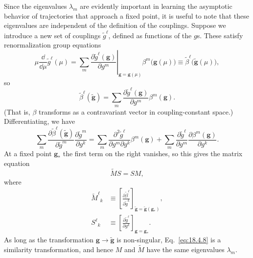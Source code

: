 Since the eigenvalues $\lambda_m$ are evidently important in learning the asymptotic behavior of trajectories that approach a fixed point, it is useful to note that these eigenvalues are independent of the definition of the couplings. Suppose we introduce a new set of couplings $\widetilde g^\ell$, defined as functions of the $g$s. These satisfy renormalization group equations
\[
\mu\frac{\dd}{\dd\mu}\widetilde g^\ell(\mu)
=\left.\sum_m\frac{\partial\widetilde g^\ell(\mathbf{g})}{\partial g^m}\right|_{\mathbf{g}=\mathbf{g}(\mu)}
\beta^m\bigl(\mathbf{g}(\mu)\bigr)
\equiv\widetilde\beta^\ell\bigl(\widetilde{\mathbf{g}}(\mu)\bigr),
\]
so
\begin{equation}
\widetilde\beta^\ell(\widetilde{\mathbf{g}})
=\sum_m\frac{\partial\widetilde g^\ell(\mathbf{g})}{\partial g^m}\beta^m(\mathbf{g}).
\tag{18.4.7}\label{eq:18.4.7}
\end{equation}
(That is, $\beta$ transforms as a contravariant vector in coupling-constant space.) Differentiating, we have
\[
\sum_m\frac{\partial\widetilde\beta^\ell(\widetilde{\mathbf{g}})}{\partial\widetilde g^m}
\frac{\partial\widetilde g^m}{\partial g^k}
=\sum_m\frac{\partial^2\widetilde g^\ell}{\partial g^m\partial g^k}\beta^m(\mathbf{g})
+\sum_m\frac{\partial\widetilde g^\ell}{\partial g^m}\frac{\partial\beta^m(\mathbf{g})}{\partial g^k}.
\]
At a fixed point $\mathbf{g}_*$ the first term on the right vanishes, so this gives the matrix equation
\begin{equation}
\widetilde M S=SM,
\tag{18.4.8}\label{eq:18.4.8}
\end{equation}
where
\begin{align}
\widetilde M^\ell{}_k&\equiv
\left[\frac{\partial\widetilde\beta^\ell}{\partial\widetilde g^k}\right]_{\widetilde{\mathbf{g}}=\widetilde{\mathbf{g}}(\mathbf{g}_*)},
\tag{18.4.9}\label{eq:18.4.9}\\
S^\ell{}_k&\equiv
\left[\frac{\partial\widetilde g^\ell}{\partial g^k}\right]_{\mathbf{g}=\mathbf{g}_*}.
\tag{18.4.10}\label{eq:18.4.10}
\end{align}
As long as the transformation $\mathbf{g}\to\widetilde{\mathbf{g}}$ is non-singular, Eq.~\eqref{eq:18.4.8} is a similarity transformation, and hence $M$ and $\widetilde M$ have the same eigenvalues $\lambda_m$.

